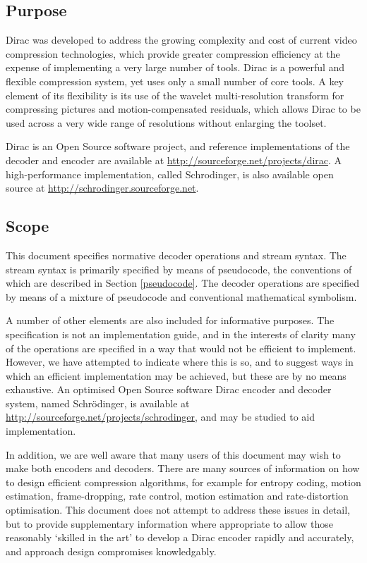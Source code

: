 

\subsection{Purpose}
\label{intropurpose}
Dirac was developed to address the growing complexity and cost of current video
compression technologies, which provide greater compression efficiency
at the expense of implementing a very large number of tools. Dirac is
a powerful and flexible compression system, yet uses only a small number
of core tools. A key element of its flexibility is its use of the wavelet
multi-resolution transform for compressing pictures and motion-compensated 
residuals, which allows Dirac to be used across a very wide range of resolutions
without enlarging the toolset.

Dirac is an Open Source software project, and reference implementations
of the decoder and encoder are available at \underline{http://sourceforge.net/projects/dirac}.
A high-performance implementation, called Schrodinger, is also available
open source at \underline{http://schrodinger.sourceforge.net}.

\subsection{Scope}
\label{introscope}

This document specifies normative decoder operations and 
stream syntax. The stream syntax is primarily specified by means of
pseudocode, the conventions of which are described in Section \ref{pseudocode}.
The decoder operations are specified by means of a mixture of pseudocode
and conventional mathematical symbolism.

A number of other elements are also included for informative purposes.
The specification is not an implementation guide, and in the interests
of clarity many of the operations are specified in a way that would not be 
efficient to implement. However, we have attempted
to indicate where this is so, and to suggest ways in which an efficient implementation
may be achieved, but these are by no means exhaustive. An optimised Open Source
software Dirac encoder and decoder system, named Schr\"odinger, is available at
\underline{http://sourceforge.net/projects/schrodinger}, and may be studied to aid implementation.

In addition, we are well aware that many users of this document may wish
to make both encoders and decoders. There are many sources of information
on how to design efficient compression algorithms, for example for entropy coding,
motion estimation, frame-dropping, rate control, motion estimation and 
rate-distortion optimisation. This document does not attempt to address these
issues in detail, but to provide supplementary information where appropriate
to allow those reasonably `skilled in the art' to develop a Dirac encoder
rapidly and accurately, and approach design compromises knowledgably.

